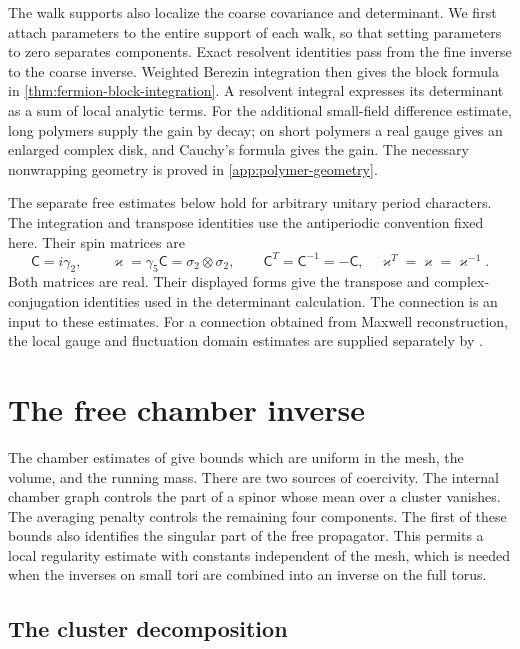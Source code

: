 The walk supports also localize the coarse covariance and determinant.
We first attach parameters to the entire support of each walk, so
that setting parameters to zero separates components. Exact resolvent
identities pass from the fine inverse to the coarse inverse.
Weighted Berezin integration then gives the block formula in
\cref{thm:fermion-block-integration}. A resolvent integral expresses
its determinant as a sum of local analytic terms. For the additional
small-field difference estimate, long polymers supply the gain by
decay; on short polymers a real gauge gives an enlarged complex disk,
and Cauchy's formula gives the gain. The necessary nonwrapping
geometry is proved in \cref{app:polymer-geometry}.

The separate free estimates below hold for arbitrary unitary period
characters. The integration and transpose identities use the
antiperiodic convention fixed here. Their spin matrices are
\[
 \mathsf C=i\gamma_2,\qquad
 \varkappa=\gamma_5\mathsf C=\sigma_2\otimes\sigma_2,
 \qquad
 \mathsf C^T=\mathsf C^{-1}=-\mathsf C,\quad
 \varkappa^T=\varkappa=\varkappa^{-1}.
\]
Both matrices are real. Their displayed forms give the transpose and
complex-conjugation identities used in the determinant calculation.
The connection is an input to these estimates. For a connection
obtained from Maxwell reconstruction, the local gauge and fluctuation
domain estimates are supplied separately by
\cite[Theorems~A and~B]{MaxwellBlockManuscript}.
\section{The free chamber inverse}\label{sec:propagators}

The chamber estimates of \cite[Section~9]{QED3Manuscript} give bounds which
are uniform in the mesh, the volume, and the running mass. There are two
sources of coercivity. The internal chamber graph controls the part of a
spinor whose mean over a cluster vanishes. The averaging penalty controls
the remaining four components. The first of these bounds also identifies
the singular part of the free propagator. This permits a local regularity
estimate with constants independent of the mesh, which is needed when
the inverses on small tori are combined into an inverse on the full torus.

\subsection{The cluster decomposition}\label{subsec:cluster-decomposition}

